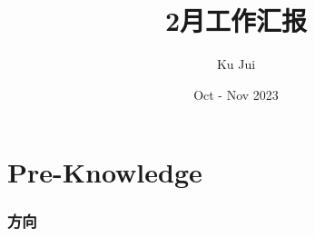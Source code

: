 \documentclass[a4paper, 10pt]{article}
\begin{document}
	
	
	\title{\songti {}2月工作汇报}
	\author{\textrm{Ku Jui}}
	\date{\textrm{Oct - Nov 2023}}
	\maketitle
	
	\renewcommand{\figurename}{Figure} %
	
	\renewcommand{\tablename}{Table}
	
	\renewcommand{\cfttoctitlefont}{\hfill\Large\bfseries\songti}
	\renewcommand{\cftaftertoctitle}{\hfill}
	\renewcommand{\contentsname}{Content}
		
	\tableofcontents
	
	
	\part{Pre-Knowledge}	
	
	\section{方向}
		
\end{document}
